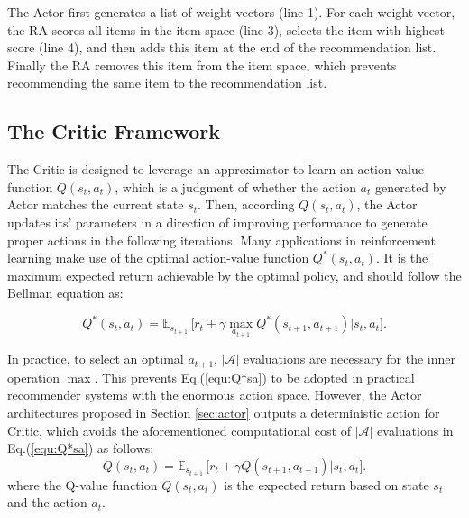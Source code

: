 The Actor first generates a list of weight vectors (line 1). For each weight vector, the RA scores all items in the item space (line 3), selects the item with highest score (line 4), and then adds this item at the end of the recommendation list. Finally the RA removes this item from the item space, which prevents recommending the same item to the recommendation list. 



\subsection{The Critic Framework}
\label{sec:traditional}
The Critic is designed to leverage an approximator to learn an action-value function $Q(s_t, a_t)$, which is a judgment of whether the action $a_t$ generated by Actor matches the current state $s_t$.  Then, according $Q(s_t, a_t)$, the Actor updates its' parameters in a direction of improving performance to generate proper actions in the following iterations.  Many applications in reinforcement learning make use of the optimal action-value function $Q^*(s_t, a_t)$. It is the maximum expected return achievable by the optimal policy, and should follow the Bellman equation \cite{bellman2013dynamic} as:

\begin{equation}\label{equ:Q*sa}
	Q^{*}(s_t, a_t)=\mathbb{E}_{s_{t+1}} \, \big[r_t+\gamma\max_{a_{t+1}}Q^{*}(s_{t+1}, a_{t+1})|s_t, a_t\big].
\end{equation}

In practice, to select an optimal $a_{t+1}$, $|\mathcal{A}|$ evaluations are necessary for the inner operation $\max$. This prevents Eq.(\ref{equ:Q*sa}) to be adopted in practical recommender systems with the enormous action space. However, the Actor architectures proposed in Section \ref{sec:actor} outputs a deterministic action for Critic, which avoids the aforementioned computational cost of $|\mathcal{A}|$ evaluations in Eq.(\ref{equ:Q*sa}) as follows:
\begin{equation}\label{equ:Qsa}
Q(s_t, a_t)=\mathbb{E}_{s_{t+1}} \, \big[r_t+\gamma Q(s_{t+1}, a_{t+1})|s_t, a_t\big].
\end{equation}
where the Q-value function $Q(s_t, a_t)$ is the expected return based on state $s_t$ and the action $a_t$.


